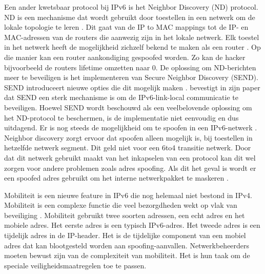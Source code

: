 Een ander kwetsbaar protocol bij IPv6 is het Neighbor Discovery (ND) protocol.  ND is een mechanisme dat wordt gebruikt door toestellen in een netwerk om de lokale topologie te leren \autocite{nikander2004ipv6}. Dit gaat van de IP to MAC mappings tot de IP- en MAC-adressen van de routers die aanwezig zijn in het lokale netwerk. Elk toestel in het netwerk heeft de mogelijkheid zichzelf bekend te maken als een router \autocite{ullrich2014ipv6}. Op die manier kan een router aankondiging gespoofed worden. Zo kan de hacker bijvoorbeeld de routers lifetime omzetten naar 0. De oplossing om ND-berichten meer te beveiligen is het implementeren van Secure Neighbor Discovery (SEND). SEND introduceert nieuwe opties die dit mogelijk maken \autocite{arkko2005secure}. \textcite{7726976} bevestigt in zijn paper dat SEND een sterk mechanisme is om de IPv6-link-local communicatie te beveiligen. Hoewel SEND wordt beschouwd als een veelbelovende oplossing om het ND-protocol te beschermen, is de implementatie niet eenvoudig en dus uitdagend.
Er is nog steeds de mogelijkheid om te spoofen in een IPv6-netwerk \autocite{1333418}. Neighbor discovery zorgt ervoor dat spoofen alleen mogelijk is, bij toestellen in hetzelfde netwerk segment. Dit geld niet voor een 6to4 transitie netwerk. Door dat dit netwerk gebruikt maakt van het inkapselen van een protocol kan dit wel zorgen voor andere problemen zoals adres spoofing. Als dit het geval is wordt er een spoofed adres gebruikt om het interne netwerkpakket te maskeren \autocite{1333418}.

Mobiliteit is een nieuwe feature in IPv6 die nog helemaal niet bestond in IPv4. Mobiliteit is een complexe functie die veel bezorgdheden wekt op vlak van beveiliging \autocite{sotillo2006ipv6}. Mobiliteit gebruikt twee soorten adressen, een echt adres en het mobiele adres. Het eerste adres is een typisch IPv6-adres. Het tweede adres is een tijdelijk adres in de IP-header. Het is de tijdelijke component van een mobiel adres dat kan blootgesteld worden aan spoofing-aanvallen. Netwerkbeheerders moeten bewust zijn van de complexiteit van mobiliteit. Het is hun taak om de speciale veiligheidsmaatregelen toe te passen.





